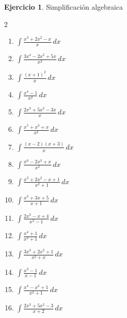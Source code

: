 \documentclass[12pt]{article}
\theoremstyle{definition}
\newtheorem{Ejer}[teorema]{Ejercicio}
\theoremstyle{remark}
\begin{document}
\begin{Ejer}{Simplificación algebraica}
\begin{multicols}{2}
\begin{enumerate}[resume=integrales]
\item $\displaystyle \int\frac{x^3+2x^2-x}{x}\,dx$
\item $\displaystyle \int\frac{3x^4-2x^2+5x}{x^2}\,dx$
\item $\displaystyle \int\frac{(x+1)^2}{x}\,dx$
\item $\displaystyle \int\frac{x^4-1}{x^2}\,dx$
\item $\displaystyle \int\frac{2x^3+5x^2-3x}{x}\,dx$
\item $\displaystyle \int\frac{x^5+x^3+x}{x^2}\,dx$
\item $\displaystyle \int\frac{(x-2)(x+3)}{x}\,dx$
\item $\displaystyle \int\frac{x^6-2x^3+x}{x^2}\,dx$
\item $\displaystyle \int \frac{x^3+2x^2-x+1}{x^2+1}\,dx$
\item $\displaystyle \int \frac{x^2+3x+5}{x+1}\,dx$
\item $\displaystyle \int \frac{2x^3-x+4}{x^2-1}\,dx$
\item $\displaystyle \int \frac{x^4+1}{x^2+1}\,dx$
\item $\displaystyle \int \frac{3x^3+2x^2+1}{x^2+x}\,dx$
\item $\displaystyle \int \frac{x^3-1}{x-1}\,dx$
\item $\displaystyle \int \frac{x^4-x^2+1}{x^2+1}\,dx$
\item $\displaystyle \int \frac{2x^3+5x^2-3}{x+2}\,dx$
\end{enumerate}
\end{multicols}
\end{Ejer}
\end{document}

